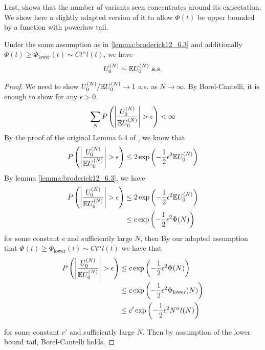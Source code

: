 Last,  shows that the number of variants seen concentrates around its expectation. We show here a slightly adapted version of it to allow $\Phi(t)$ be upper bounded by a function with powerlaw tail. 
\begin{myLemma}
    \label{lemma:broderick12_6.4}
    Under the same assumption as in \cref{lemma:broderick12_6.3} and additionally $\Phi(t)\ge \Phi_{\text{lower}}(t)\sim Ct^\alpha l(t)$, we have 
    \begin{align*}
        U_{ 0}^{(N)} \sim \mathbb{E} U_{ 0}^{(N)} \text{  a.s.}
    \end{align*}
\end{myLemma}
\begin{proof}
    We need to show $U_{ 0}^{(N)}/\mathbb{E} U_{ 0}^{(N)}\to 1$ a.s. as $N\to\infty$. By Borel-Cantelli, it is enough to show for any $\epsilon>0$
    \begin{align*}
        \sum_{N}P\left(\left|\frac{\news{0}{N}}{\E \news{0}{N}}\right|>\epsilon\right)<\infty
    \end{align*}
    By the proof of the original Lemma 6.4 of \citet{Broderick2012}, we know that 
    \begin{align*}
        P\left(\left|\frac{\news{0}{N}}{\E \news{0}{N}}\right|>\epsilon\right)\le 2\exp\left(-\frac{1}{2}\epsilon^2\E \news{0}{N}\right)
    \end{align*}
    By lemma \cref{lemma:broderick12_6.3}, we have 
    \begin{align*}
        P\left(\left|\frac{\news{0}{N}}{\E \news{0}{N}}\right|>\epsilon\right)&\le 2\exp\left(-\frac{1}{2}\epsilon^2\E \news{0}{N}\right)\\
        &\le c\exp\left(-\frac{1}{2}\epsilon^2\Phi(N)\right)
    \end{align*}
for some constant $c$ and sufficiently large $N$, then 
By our adapted assumption that $\Phi(t)\ge \Phi_{\text{lower}}(t)\sim Ct^\alpha l(t)$ we have that
    \begin{align*}
        P\left(\left|\frac{\news{0}{N}}{\E \news{0}{N}}\right|>\epsilon\right)&\le c\exp\left(-\frac{1}{2}\epsilon^2\Phi(N)\right)\\
        &\le c\exp\left(-\frac{1}{2}\epsilon^2\Phi_{\text{lower}}(N)\right)\\
        &\le c'\exp\left(-\frac{1}{2}\epsilon^2N^\alpha l(N)\right)
    \end{align*}

    for some constant $c'$ and sufficiently large $N$. Then by assumption of the lower bound tail, Borel-Cantelli holds. 
\end{proof}



